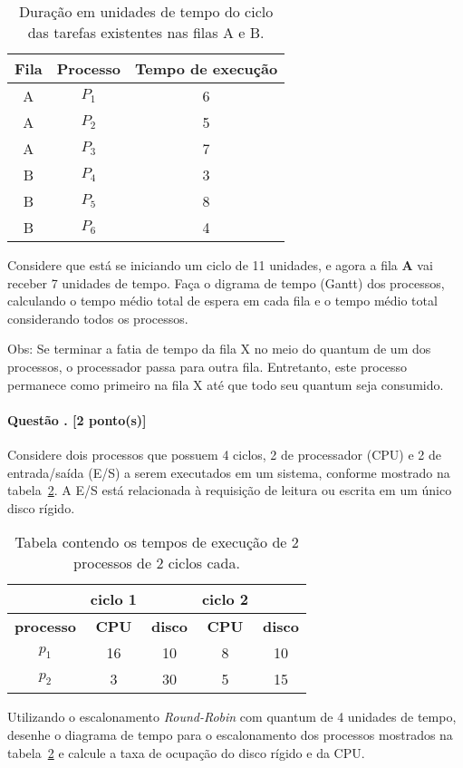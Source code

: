 \documentclass[11pt,twoside]{article}
\newcounter{qno}\setcounter{qno}{0}
\newcounter{grade}\setcounter{grade}{0}
\def\newex#1{\addtocounter{qno}{1}\addtocounter{grade}{#1}
\paragraph{Questão \arabic{qno}. [#1 ponto(s)]}\marginpar{\tiny $\frac{\arabic{grade}}{10}$}}
\let\oldmarginpar\marginpar
\renewcommand\marginpar[1]{\-\oldmarginpar[\raggedleft\tiny#1]%
{\raggedright\tiny#1}}
\begin{document}
\begin{table}[h]
  \centering
  \begin{tabular}{c|c|c}\hline
    \bf Fila & \bf Processo & \bf Tempo de execução \\ \hline\hline
    A & $P_1$ & 6 \\\hline
    A & $P_2$ & 5 \\\hline
    A & $P_3$ & 7 \\\hline
    B & $P_4$ & 3 \\\hline
    B & $P_5$ & 8 \\\hline
    B & $P_6$ & 4 \\\hline
  \end{tabular}
  \caption{Duração em unidades de tempo do ciclo das tarefas existentes nas filas A e B.}
  \label{so:sched}
\end{table}

\noindent Considere que está se iniciando um ciclo de 11 unidades, e
agora a fila {\bf A} vai receber 7 unidades de tempo. Faça o digrama
de tempo (Gantt) dos processos, calculando o tempo médio total de espera em
cada fila e o tempo médio total considerando todos os processos.

\noindent Obs: Se terminar a fatia de tempo da fila X no meio do 
quantum de um dos processos, o processador passa para outra
fila. Entretanto, este processo permanece como primeiro na fila X até
que todo seu quantum seja consumido.

\newex{2} Considere dois processos que possuem 4 ciclos, 2 de
processador (CPU) e 2 de entrada/saída (E/S) a serem executados em um
sistema, conforme mostrado na tabela~\ref{tab:ioproc}. A E/S está
relacionada à requisição de leitura ou escrita em um único disco
rígido.

\begin{table}[h]
  \centering
  \begin{tabular}{c|cc|cc}\hline
    & ciclo 1 & & ciclo 2 &  \\\hline
    \bf processo & \bf CPU & \bf disco & \bf CPU & \bf disco \\\hline
    $p_1$ & 16 & 10 & 8 & 10  \\
    $p_2$ & 3 & 30 & 5 & 15 \\\hline
  \end{tabular}
  \caption{Tabela contendo os tempos de execução de 2 processos de 2
    ciclos cada.}
  \label{tab:ioproc}
\end{table}

Utilizando o escalonamento {\em Round-Robin} com quantum de 4 unidades
de tempo, desenhe o diagrama de tempo para o escalonamento dos
processos mostrados na tabela~\ref{tab:ioproc} e calcule a taxa de
ocupação do disco rígido e da CPU.
\end{document}
